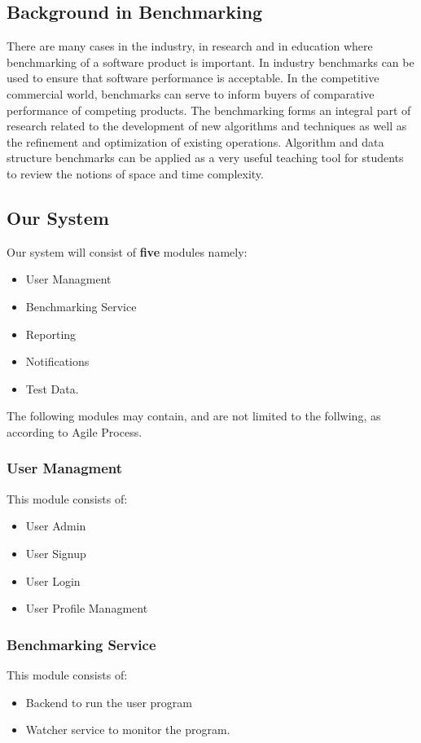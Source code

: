 \subsection{Background in Benchmarking}
There are many cases in the industry, in research and in education where benchmarking of
a software product is important. In industry benchmarks can be used to ensure that software
performance is acceptable. In the competitive commercial world, benchmarks can serve to inform
buyers of comparative performance of competing products. The benchmarking forms an integral
part of research related to the development of new algorithms and techniques as well as the refinement
and optimization of existing operations. Algorithm and data structure benchmarks can be applied
as a very useful teaching tool for students to review the notions of space and time complexity.

\subsection{Our System}
Our system will consist of \textbf{five} modules namely:
\begin{itemize}
	\item User Managment 
	\item Benchmarking Service
	\item Reporting
	\item Notifications 
	\item Test Data.
\end{itemize}
The following modules may contain, and are not limited to the follwing, as according to Agile Process.

\subsubsection{User Managment}
This module consists of:
\begin{itemize}
  \item User Admin
  \item User Signup
  \item User Login
  \item User Profile Managment
\end{itemize}

\subsubsection{Benchmarking Service}
This module consists of:
\begin{itemize}
  \item Backend to run the user program
  \item Watcher service to monitor the program.
\end{itemize}

